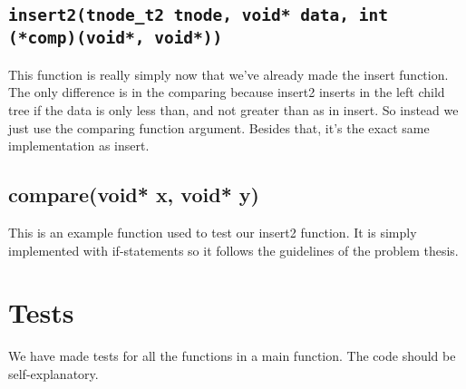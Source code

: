 \documentclass[11pt,a4paper]{article}
\begin{document}
\subsection{\texttt{insert2(tnode\_t2 tnode, void* data, int (*comp)(void*,
void*))}}
This function is really simply now that we've already made the insert function.
The only difference is in the comparing because insert2 inserts in the left
child tree if the data is only less than, and not greater than as in insert. So
instead we just use the comparing function argument. Besides that, it's the
exact same implementation as insert.

\subsection{compare(void* x, void* y)}
This is an example function used to test our insert2 function. It is simply
implemented with if-statements so it follows the guidelines of the problem
thesis. 

\section{Tests}
We have made tests for all the functions in a main function. The code should be
self-explanatory.
\end{document}

